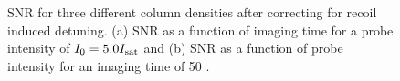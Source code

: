 %
%


\begin{figure}
\caption[Signal-to-noise optimization]{SNR for three different column densities after correcting for recoil induced detuning. (a) SNR as a function of imaging time for a probe intensity of $I_0=5.0 I_{\rm sat}$ and (b) SNR as a function of probe intensity for an imaging time of 50 \us{}.}
\label{fig:SNR}
\end{figure}

%
